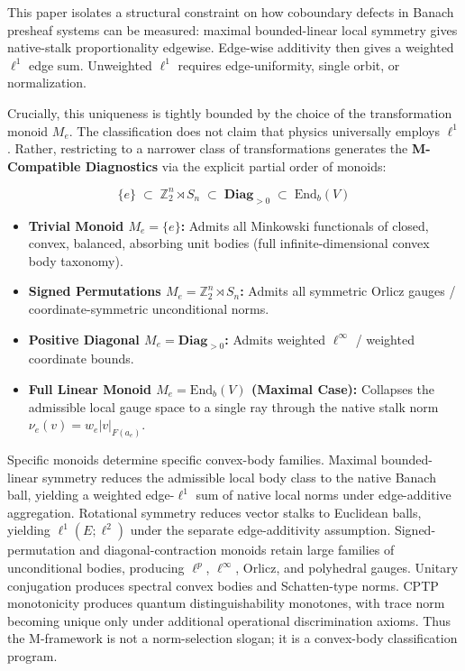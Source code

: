 \documentclass[
  11pt,
]{article}
\providecommand{\tightlist}{%
  \setlength{\itemsep}{0pt}\setlength{\parskip}{0pt}}
\providecommand{\tightlist}{%
  \setlength{\itemsep}{0pt}\setlength{\parskip}{0pt}}
\begin{document}
This paper isolates a structural constraint on how coboundary defects in Banach presheaf systems can be measured: maximal bounded-linear local symmetry gives native-stalk proportionality edgewise. Edge-wise additivity then gives a weighted \(\ell^1\) edge sum. Unweighted \(\ell^1\) requires edge-uniformity, single orbit, or normalization.

Crucially, this uniqueness is tightly bounded by the choice of the transformation monoid \(M_e\). The classification does not claim that physics universally employs \(\ell^1\). Rather, restricting to a narrower class of transformations generates the \textbf{M-Compatible Diagnostics} via the explicit partial order of monoids:

\[\{e\} \;\subset\; \mathbb{Z}_2^n \rtimes S_n \;\subset\; \mathbf{Diag}_{>0} \;\subset\; \mathrm{End}_b(V)\]

\begin{itemize}
\tightlist
\item
  \textbf{Trivial Monoid \(M_e = \{e\}\):} Admits all Minkowski functionals of closed, convex, balanced, absorbing unit bodies (full infinite-dimensional convex body taxonomy).
\item
  \textbf{Signed Permutations \(M_e = \mathbb{Z}_2^n \rtimes S_n\):} Admits all symmetric Orlicz gauges / coordinate-symmetric unconditional norms.
\item
  \textbf{Positive Diagonal \(M_e = \mathbf{Diag}_{>0}\):} Admits weighted \(\ell^\infty\) / weighted coordinate bounds.
\item
  \textbf{Full Linear Monoid \(M_e = \mathrm{End}_b(V)\) (Maximal Case):} Collapses the admissible local gauge space to a single ray through the native stalk norm \(\nu_e(v) = w_e |v|_{F(a_e)}\).
\end{itemize}

Specific monoids determine specific convex-body families. Maximal bounded-linear symmetry reduces the admissible local body class to the native Banach ball, yielding a weighted edge-\(\ell^1\) sum of native local norms under edge-additive aggregation. Rotational symmetry reduces vector stalks to Euclidean balls, yielding \(\ell^1(E; \ell^2)\) under the separate edge-additivity assumption. Signed-permutation and diagonal-contraction monoids retain large families of unconditional bodies, producing \(\ell^p\), \(\ell^\infty\), Orlicz, and polyhedral gauges. Unitary conjugation produces spectral convex bodies and Schatten-type norms. CPTP monotonicity produces quantum distinguishability monotones, with trace norm becoming unique only under additional operational discrimination axioms. Thus the M-framework is not a norm-selection slogan; it is a convex-body classification program.
\end{document}
